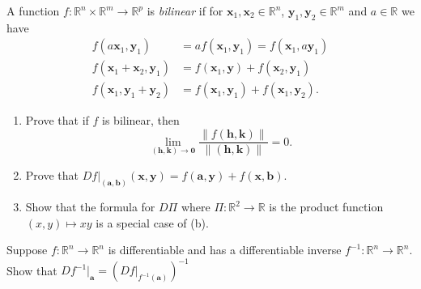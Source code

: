 \documentclass[12 pt, letterpaper]{hmcpset}
\begin{document}
\begin{problem}[12.]
	A function $f : \mathbb{R}^{n} \times \mathbb{R}^{m} \to \mathbb{R}^{p}$ is \textit{bilinear} if for $\mathbf{x}_{1}, \mathbf{x}_{2} \in \mathbb{R}^{n}$, $\mathbf{y}_{1}, \mathbf{y}_{2} \in \mathbb{R}^{m}$ and $a \in \mathbb{R}$ we have
	\[
		\begin{split}
			f(a \mathbf{x}_{1}, \mathbf{y}_{1}) & = a f(\mathbf{x}_{1}, \mathbf{y}_{1}) = f(\mathbf{x}_{1}, a \mathbf{y}_{1}) \\
			f(\mathbf{x}_{1} + \mathbf{x}_{2}, \mathbf{y}_{1}) & = f(\mathbf{x}_{1}, \mathbf{y}) + f(\mathbf{x}_{2}, \mathbf{y}_{1}) \\
			f(\mathbf{x}_{1}, \mathbf{y}_{1} + \mathbf{y}_{2}) & = f(\mathbf{x}_{1}, \mathbf{y}_{1}) + f(\mathbf{x}_{1}, \mathbf{y}_{2}).
		\end{split}
	\]
	\begin{enumerate}
		\item Prove that if $f$ is bilinear, then
			\[
				\lim_{(\mathbf{h}, \mathbf{k}) \to \mathbf{0}} \frac{\lVert f(\mathbf{h}, \mathbf{k}) \rVert}{\lVert (\mathbf{h}, \mathbf{k}) \rVert} = 0.
			\]
		\item Prove that $Df \Big |_{(\mathbf{a}, \mathbf{b})} (\mathbf{x}, \mathbf{y}) = f(\mathbf{a}, \mathbf{y}) + f(\mathbf{x}, \mathbf{b})$.
		\item Show that the formula for $D \Pi$ where $\Pi : \mathbb{R}^{2} \to \mathbb{R}$ is the product function $(x, y) \mapsto xy$ is a special case of (b).
	\end{enumerate}
\end{problem}

\pagebreak

\begin{problem}[16.]
	Suppose $f : \mathbb{R}^{n} \to \mathbb{R}^{n}$ is differentiable and has a differentiable inverse $f^{-1} : \mathbb{R}^{n} \to \mathbb{R}^{n}$. Show that $D f^{-1} \Big |_{\mathbf{a}} = (Df \Big |_{f^{-1}(\mathbf{a})})^{-1}$
\end{problem}

\pagebreak
\end{document}
